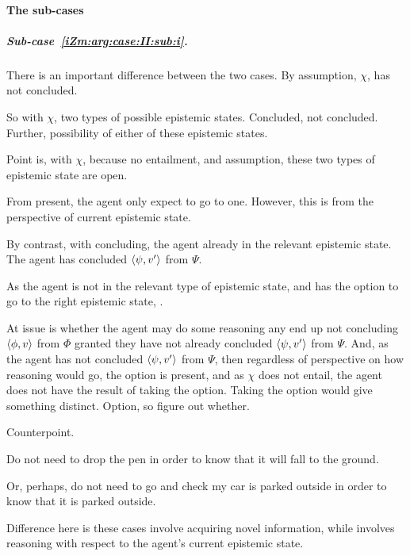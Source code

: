 \paragraph{The sub-cases}

\subparagraph*{Sub-case~\ref{iZm:arg:case:II:sub:i}.}

\begin{note}
  There is an important difference between the two cases.
  By assumption, \(\chi\), has not concluded.

  So with \(\chi\), two types of possible epistemic states.
  Concluded, not concluded.
  Further, possibility of either of these epistemic states.

  Point is, with \(\chi\), because no entailment, and assumption, these two types of epistemic state are open.

  From present, the agent only expect to go to one.
  However, this is from the perspective of current epistemic state.

  By contrast, with concluding, the agent already in the relevant epistemic state.
  The agent has concluded \(\langle \psi, v' \rangle\) from \(\Psi\).
\end{note}

\begin{note}
  As the agent is not in the relevant type of epistemic state, and has the option to go to the right epistemic state, \qzS{}.
\end{note}

\begin{note}
  At issue is whether the agent may do some reasoning any end up not concluding \(\langle \phi, v \rangle\) from \(\Phi\) granted they have not already concluded \(\langle \psi, v' \rangle\) from \(\Psi\).
  And, as the agent has not concluded \(\langle \psi, v' \rangle\) from \(\Psi\), then regardless of perspective on how reasoning would go, the option is present, and as \(\chi\) does not entail, the agent does not have the result of taking the option.
  Taking the option would give something distinct.
  Option, so figure out whether.
\end{note}

\begin{note}
  Counterpoint.

  Do not need to drop the pen in order to know that it will fall to the ground.

  Or, perhaps, do not need to go and check my car is parked outside in order to know that it is parked outside.

  Difference here is these cases involve acquiring novel information, while \qzS{} involves reasoning with respect to the agent's current epistemic state.
\end{note}

